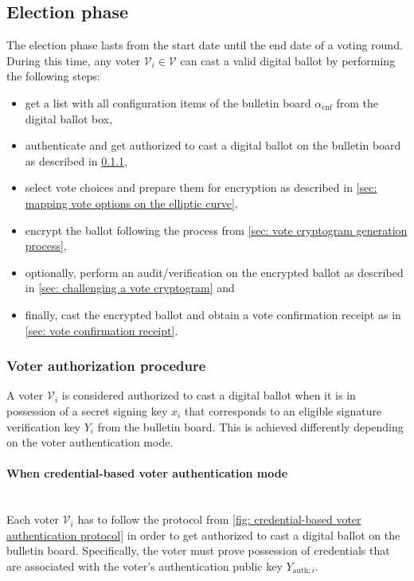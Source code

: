\subsection{Election phase} \label{sec: election phase}
The election phase lasts from the start date until the end date of a voting round. During this time, any voter $\mathcal{V}_i \in \boldsymbol{\mathcal{V}}$ can cast a valid digital ballot by performing the following steps:
\begin{itemize}
    \item get a list with all configuration items of the bulletin board $\alpha_\mathrm{cnf}$ from the digital ballot box,
    \item authenticate and get authorized to cast a digital ballot on the bulletin board as described in \cref{sec: voter authorization procedure},
    \item select vote choices and prepare them for encryption as described in \cref{sec: mapping vote options on the elliptic curve},
    \item encrypt the ballot following the process from \cref{sec: vote cryptogram generation process},
    \item optionally, perform an audit/verification on the encrypted ballot as described in \cref{sec: challenging a vote cryptogram} and
    \item finally, cast the encrypted ballot and obtain a vote confirmation receipt as in \cref{sec: vote confirmation receipt}.
\end{itemize}


\subsubsection{Voter authorization procedure} \label{sec: voter authorization procedure}
A voter $\mathcal{V}_i$ is considered authorized to cast a digital ballot when it is in possession of a secret signing key $x_i$ that corresponds to an eligible signature verification key $Y_i$ from the bulletin board. This is achieved differently depending on the voter authentication mode.


\paragraph{When credential-based voter authentication mode}\mbox{}\\
Each voter $\mathcal{V}_i$ has to follow the protocol from \cref{fig: credential-based voter authentication protocol} in order to get authorized to cast a digital ballot on the bulletin board. Specifically, the voter must prove possession of credentials that are associated with the voter's authentication public key $Y_{\mathrm{auth}; i}$.

